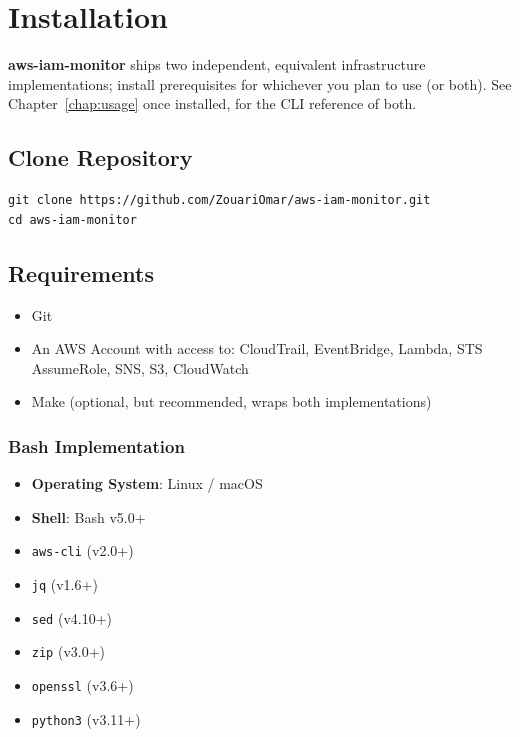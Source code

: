 \documentclass[11pt,a4paper]{report}
\begin{document}
\chapter{Installation}

\textbf{aws-iam-monitor} ships two independent, equivalent infrastructure
implementations; install prerequisites for whichever you plan to use (or
both). See Chapter~\ref{chap:usage} once installed, for the CLI reference of
both.

\section{Clone Repository}

\begin{lstlisting}
git clone https://github.com/ZouariOmar/aws-iam-monitor.git
cd aws-iam-monitor
\end{lstlisting}

\section{Requirements}

\begin{itemize}[leftmargin=1.4em]
  \item Git
  \item An AWS Account with access to: CloudTrail, EventBridge, Lambda, STS AssumeRole, SNS, S3, CloudWatch
  \item Make (optional, but recommended, wraps both implementations)
\end{itemize}

\subsection{Bash Implementation}

\begin{itemize}[leftmargin=1.4em]
  \item \textbf{Operating System}: Linux / macOS
  \item \textbf{Shell}: Bash v5.0+
  \item \texttt{aws-cli} (v2.0+)
  \item \texttt{jq} (v1.6+)
  \item \texttt{sed} (v4.10+)
  \item \texttt{zip} (v3.0+)
  \item \texttt{openssl} (v3.6+)
  \item \texttt{python3} (v3.11+)
\end{itemize}
\end{document}
